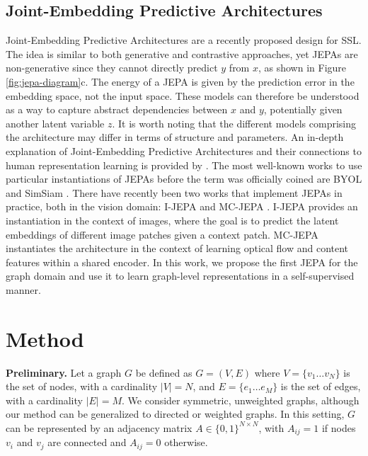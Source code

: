\documentclass{article} \usepackage{iclr2024_conference,times}
\begin{document}
\subsection{Joint-Embedding Predictive Architectures}
Joint-Embedding Predictive Architectures \citep{lecun2022path} are a recently proposed design for SSL. The idea is similar to both generative and contrastive approaches, yet JEPAs are non-generative since they cannot directly predict $y$ from $x$, as shown in Figure \ref{fig:jepa-diagram}c. The energy of a JEPA is given by the prediction error in the embedding space, not the input space. These models can therefore be understood as a way to capture abstract dependencies between $x$ and $y$, potentially given another latent variable $z$. It is worth noting that the different models comprising the architecture may differ in terms of structure and parameters. An in-depth explanation of Joint-Embedding Predictive Architectures and their connections to human representation learning is provided by \citet{lecun2022path}. The most well-known works to use particular instantiations of JEPAs before the term was officially coined are BYOL \citep{grill2020bootstrap} and SimSiam \citep{chen2021exploring}. There have recently been two works that implement JEPAs in practice, both in the vision domain: I-JEPA \citep{assran2023self} and MC-JEPA \citep{bardes2023mc}. I-JEPA provides an instantiation in the context of images, where the goal is to predict the latent embeddings of different image patches given a context patch. MC-JEPA instantiates the architecture in the context of learning optical flow and content features within a shared encoder. In this work, we propose the first JEPA for the graph domain and use it to learn graph-level representations in a self-supervised manner.

\section{Method}
\textbf{Preliminary.} Let a graph $G$ be defined as $G = (V, E)$ where $V = \{v_1 \ldots v_N\}$ is the set of nodes, with a cardinality $|V| = N$, and $E = \{e_1 \ldots e_M\}$ is the set of edges, with a cardinality $|E| = M$. We consider symmetric, unweighted graphs, although our method can be generalized to directed or weighted graphs. In this setting, $G$ can be represented by an adjacency matrix $A \in \{0,1\}^{N \times N}$, with $A_{ij} = 1$ if nodes $v_i$ and $v_j$ are connected and $A_{ij} = 0$ otherwise.
\end{document}
